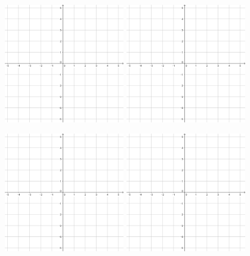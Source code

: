\documentclass[a4paper]{oblivoir}
\begin{document}
\begin{figure}
\noindent\includegraphics[width=0.47\textwidth]{55}
\hspace{30pt}\includegraphics[width=0.47\textwidth]{55}
\par\vspace{40pt}
\noindent\includegraphics[width=0.47\textwidth]{55}
\hspace{30pt}\includegraphics[width=0.47\textwidth]{55}
\end{figure}
\end{document}
